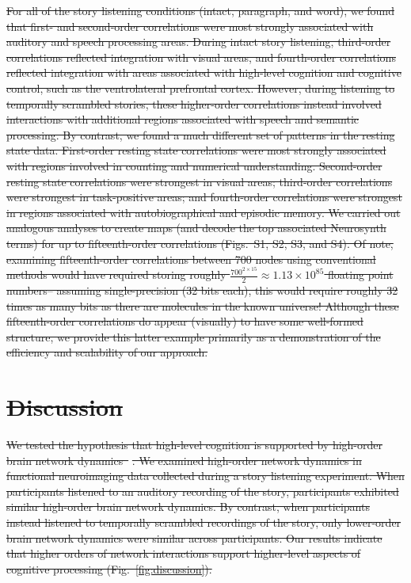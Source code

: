 \documentclass[english]{article}
\newcommand{\intact}{S1}
\newcommand{\para}{S2}
\newcommand{\word}{S3}
\newcommand{\rest}{S4}
\providecommand{\DIFdeltex}[1]{{\protect\color{red}\sout{#1}}}                      %
\providecommand{\DIFdel}[1]{\texorpdfstring{\DIFdeltex{#1}}{}} %
\begin{document}
\DIFdel{For all of the story listening conditions (intact, paragraph, and
word), we found that first- and second-order correlations were most
strongly associated with auditory and speech processing areas.  During
intact story listening, third-order correlations reflected integration
with visual areas, and fourth-order correlations reflected integration
with areas associated with high-level cognition and cognitive control,
such as the ventrolateral prefrontal cortex.  However, during
listening to temporally scrambled stories, these higher-order
correlations instead involved interactions with additional regions
associated with speech and semantic processing.  By contrast, we found
a much different set of patterns in the resting state data.
First-order resting state correlations were most strongly associated
with regions involved in counting and numerical understanding.
Second-order resting state correlations were strongest in visual
areas; third-order correlations were strongest in task-positive areas;
and fourth-order correlations were strongest in regions associated
with autobiographical and episodic memory.  We carried out analogous
analyses to create maps (and decode the top associated Neurosynth
terms) for up to fifteenth-order correlations (Figs.~\intact, \para, \word, and
\rest).  Of note, examining fifteenth-order correlations between 700
nodes using conventional methods would have required storing roughly
$\frac{700^{2 \times 15}}{2} \approx 1.13 \times 10^{85}$ floating
point numbers-- assuming single-precision (32 bits each), this would
require roughly 32 times as many bits as there are molecules in the
known universe!  Although these fifteenth-order correlations do appear
(visually) to have some well-formed structure, we provide this latter
example primarily as a demonstration of the efficiency and scalability
of our approach.
}%

\section*{\DIFdel{Discussion}}
\DIFdel{We tested the hypothesis that high-level cognition is supported by
high-order brain network dynamics~}%
\DIFdel{.  We examined high-order network dynamics in functional
neuroimaging data collected during a story listening experiment.  When
participants listened to an auditory recording of the story,
participants exhibited similar high-order brain network dynamics.  By
contrast, when participants instead listened to temporally scrambled
recordings of the story, only lower-order brain network dynamics were
similar across participants.  Our results indicate that higher orders
of network interactions support higher-level aspects of cognitive
processing (Fig.~\ref{fig:discussion}).
}%
\end{document}
